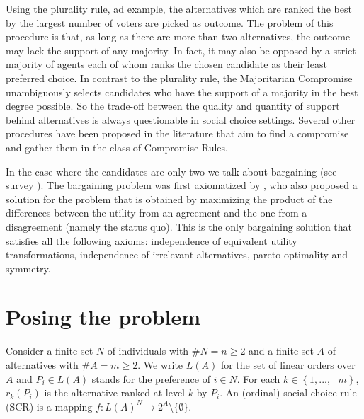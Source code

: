 \documentclass[version=3.21, pagesize, notitlepage, twoside=off, bibliography=totoc, DIV=calc, fontsize=12pt, a4paper]{scrartcl}
\begin{document}
Using the plurality rule, ad example, the alternatives which are ranked the best by the largest number of voters are picked as outcome. The problem of this procedure is that, as long as there are more than two alternatives, the outcome may lack the support of any majority. In fact, it may also be opposed by a strict majority of agents each of whom ranks the chosen candidate as their least preferred choice. In contrast to the plurality rule, the Majoritarian Compromise \cite{Sertel1999} unambiguously selects candidates who have the support of a majority in the best degree possible. So the trade-off between the quality and quantity of support behind alternatives is always questionable in social choice settings. Several other procedures have been proposed in the literature that aim to find a compromise and \cite{Merlin2019} gather them in the class of Compromise Rules.

In the case where the candidates are only two we talk about bargaining (see survey \cite{Thomson1994}). The bargaining problem was first axiomatized by \cite{Nash1950}, who also proposed a solution for the problem that is obtained by maximizing the product of the differences between the utility from an agreement and the one from a disagreement (namely the status quo). This is the only bargaining solution that satisfies all the following axioms: independence of equivalent utility transformations, independence of irrelevant alternatives, pareto optimality and symmetry.
	
\section{Posing the problem}
Consider a finite set $N$ of individuals with $\#N=n\geq 2$ and a finite set $A$ of alternatives with $\#A=m\geq 2$. We write $L(A)$ for the set of linear orders over $A$ and $P_{i}\in L(A)$ stands for the preference of $i\in N$. For each $k\in \left\{ 1,...,\text{ }m\right\} $, $r_{k}(P_{i})$ is the alternative ranked at level $k$ by $P_{i}$. An (ordinal) social choice rule (SCR) is a mapping $f:L(A)^{N}\rightarrow 2^{A} \setminus \{\emptyset \}$.
\end{document}
